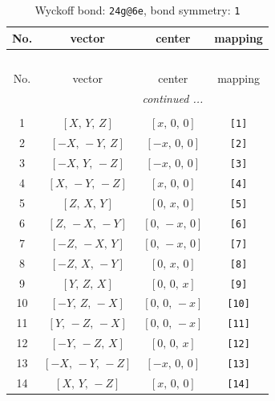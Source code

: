 \documentclass[fleqn,8pt]{jsarticle}
\begin{document}
\begin{longtable}{cccc}
\caption{Wyckoff bond: {\tt 24g@6e}, bond symmetry: {\tt 1}}
 \\
 \hline \hline
No. & vector & center & mapping \\ \hline \endfirsthead

\multicolumn{3}{l}{\tablename\ \thetable{}} \\
 \hline \hline
No. & vector & center & mapping \\ \hline \endhead

 \hline \hline
\multicolumn{3}{r}{\footnotesize\it continued ...} \\ \endfoot

 \hline \hline
\multicolumn{3}{r}{} \\ \endlastfoot

1 & $\left[ X,\, Y,\, Z \right]$ & $\left[ x,\, 0,\, 0 \right]$ & {\tt [1]} \\ \hline
2 & $\left[ - X,\, - Y,\, Z \right]$ & $\left[ - x,\, 0,\, 0 \right]$ & {\tt [2]} \\ \hline
3 & $\left[ - X,\, Y,\, - Z \right]$ & $\left[ - x,\, 0,\, 0 \right]$ & {\tt [3]} \\ \hline
4 & $\left[ X,\, - Y,\, - Z \right]$ & $\left[ x,\, 0,\, 0 \right]$ & {\tt [4]} \\ \hline
5 & $\left[ Z,\, X,\, Y \right]$ & $\left[ 0,\, x,\, 0 \right]$ & {\tt [5]} \\ \hline
6 & $\left[ Z,\, - X,\, - Y \right]$ & $\left[ 0,\, - x,\, 0 \right]$ & {\tt [6]} \\ \hline
7 & $\left[ - Z,\, - X,\, Y \right]$ & $\left[ 0,\, - x,\, 0 \right]$ & {\tt [7]} \\ \hline
8 & $\left[ - Z,\, X,\, - Y \right]$ & $\left[ 0,\, x,\, 0 \right]$ & {\tt [8]} \\ \hline
9 & $\left[ Y,\, Z,\, X \right]$ & $\left[ 0,\, 0,\, x \right]$ & {\tt [9]} \\ \hline
10 & $\left[ - Y,\, Z,\, - X \right]$ & $\left[ 0,\, 0,\, - x \right]$ & {\tt [10]} \\ \hline
11 & $\left[ Y,\, - Z,\, - X \right]$ & $\left[ 0,\, 0,\, - x \right]$ & {\tt [11]} \\ \hline
12 & $\left[ - Y,\, - Z,\, X \right]$ & $\left[ 0,\, 0,\, x \right]$ & {\tt [12]} \\ \hline
13 & $\left[ - X,\, - Y,\, - Z \right]$ & $\left[ - x,\, 0,\, 0 \right]$ & {\tt [13]} \\ \hline
14 & $\left[ X,\, Y,\, - Z \right]$ & $\left[ x,\, 0,\, 0 \right]$ & {\tt [14]} \\ \hline

\end{longtable}
\end{document}
